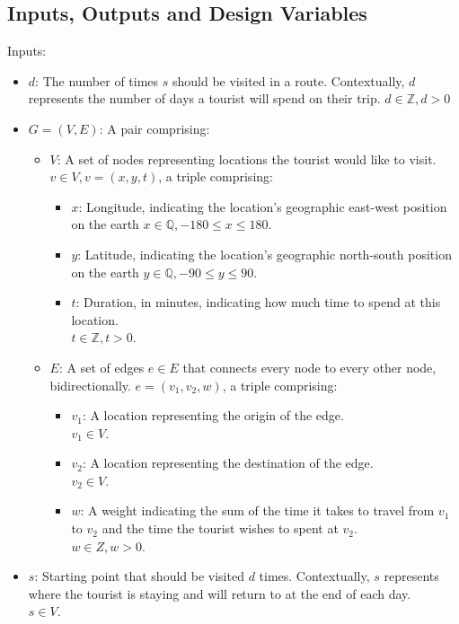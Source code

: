 \subsection{Inputs, Outputs and Design Variables}\label{subsec:inputs-and-outputs}
Inputs:
\begin{itemize}
    \item $d$: The number of times $s$ should be visited in a route.
    Contextually, $d$ represents the number of days a tourist will spend on their trip. $d \in \mathbb{Z}, d > 0$
    \item $G = (V, E)$: A pair comprising:
    \begin{itemize}
        \item[\textbullet] $V$: A set of nodes representing locations the tourist would like to visit.
        $v \in V, v = (x, y, t)$, a triple comprising:
        \begin{itemize}
            \item[\textbullet]$x$: Longitude, indicating the location's geographic east-west position on the earth
            $x \in \mathbb{Q}, -180 \leq x \leq 180$.
            \item[\textbullet]$y$: Latitude, indicating the location's geographic north-south position on the earth
            $y \in \mathbb{Q}, -90 \leq y \leq 90$.
            \item[\textbullet]$t$: Duration, in minutes, indicating how much time to spend at this location.\\
            $t \in \mathbb{Z}, t > 0$.
        \end{itemize}
        \item[\textbullet] $E$: A set of edges $e \in E$ that connects every node to every other node,
        bidirectionally. $e = (v_1, v_2, w)$, a triple comprising:
        \begin{itemize}
            \item[\textbullet]$v_1$: A location representing the origin of the edge.\\
            $v_1 \in V$.
            \item[\textbullet]$v_2$: A location representing the destination of the edge.\\
            $v_2 \in V$.
            \item[\textbullet]$w$: A weight indicating the sum of the time it takes to travel from $v_1$ to $v_2$
            and the time the tourist wishes to spent at $v_2$.\\
            $w \in Z, w > 0$.
        \end{itemize}
    \end{itemize}
    \item $s$: Starting point that should be visited $d$ times.
    Contextually, $s$ represents where the tourist is staying and will return to at the end of each day.\\
    $s \in V$.
\end{itemize}
